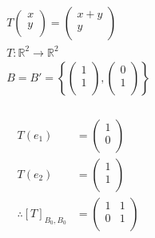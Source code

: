 \documentclass[fleqn, a4paper, twocolumn, draft]{article}
\theoremstyle{definition}
\theoremstyle{theorem}
\theoremstyle{remark}
\numberwithin{corollary}{theorem}
\numberwithin{equation}{theorem}
\begin{document}
\section{}

\subsection{}

\begin{gather*}
	T 
		\begin{pmatrix}
			x\\
			y\\
		\end{pmatrix}
	=
		\begin{pmatrix}
			x + y\\
			y\\
		\end{pmatrix}\\
	T : \mathbb{R}^2 \to \mathbb{R}^2\\
	B = B' = 
		\left\lbrace
			\begin{pmatrix}
				1\\
				1\\
			\end{pmatrix}
			,
			\begin{pmatrix}
				0\\
				1\\
			\end{pmatrix}
		\right\rbrace
\end{gather*}

\subsubsection{}

\begin{align*}
	T(e_1) &= 
		\begin{pmatrix}
			1\\
			0\\
		\end{pmatrix}\\
	T(e_2) &= 
		\begin{pmatrix}
			1\\
			1\\
		\end{pmatrix}\\
	\therefore [T]_{B_0, B_0} &= 
		\begin{pmatrix}
			1 & 1\\
			0 & 1\\
		\end{pmatrix}
\end{align*}
\end{document}
